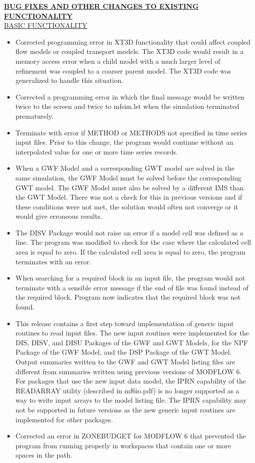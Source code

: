 \documentclass[11pt,twoside,twocolumn]{usgsreport}
\begin{document}
\begin{itemize}
	\textbf{\underline{BUG FIXES AND OTHER CHANGES TO EXISTING FUNCTIONALITY}} \\
	\underline{BASIC FUNCTIONALITY}
	\begin{itemize}
		\item Corrected programming error in XT3D functionality that could affect coupled flow models or coupled transport models.  The XT3D code would result in a memory access error when a child model with a much larger level of refinement was coupled to a coarser parent model.  The XT3D code was generalized to handle this situation. 
		\item Corrected a programming error in which the final message would be written twice to the screen and twice to mfsim.lst when the simulation terminated prematurely. 
		\item Terminate with error if METHOD or METHODS not specified in time series input files.  Prior to this change, the program would continue without an interpolated value for one or more time series records.
		\item When a GWF Model and a corresponding GWT model are solved in the same simulation, the GWF Model must be solved before the corresponding GWT model.  The GWF Model must also be solved by a different IMS than the GWT Model.  There was not a check for this in previous versions and if these conditions were not met, the solution would often not converge or it would give erroneous results.
		\item The DISV Package would not raise an error if a model cell was defined as a line.  The program was modified to check for the case where the calculated cell area is equal to zero.  If the calculated cell area is equal to zero, the program terminates with an error.
		\item When searching for a required block in an input file, the program would not terminate with a sensible error message if the end of file was found instead of the required block.  Program now indicates that the required block was not found.
		\item This release contains a first step toward implementation of generic input routines to read input files.  The new input routines were implemented for the DIS, DISV, and DISU Packages of the GWF and GWT Models, for the NPF Package of the GWF Model, and the DSP Package of the GWT Model.  Output summaries written to the GWF and GWT Model listing files are different from summaries written using previous versions of MODFLOW 6.  For packages that use the new input data model, the IPRN capability of the READARRAY utility (described in mf6io.pdf) is no longer supported as a way to write input arrays to the model listing file.  The IPRN capability may not be supported in future versions as the new generic input routines are implemented for other packages.
		\item Corrected an error in ZONEBUDGET for MODFLOW 6 that prevented the program from running properly in workspaces that contain one or more spaces in the path.
	\end{itemize}


\end{itemize}
\end{document}
